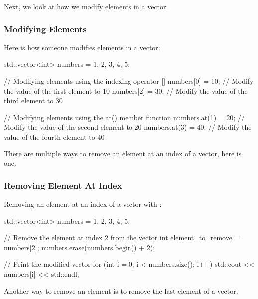 Next, we look at how we modify elements in a vector.

\begin{highlight}

\subsubsection*{Modifying Elements}

Here is how someone modifies elements in a vector:

\begin{code}
std::vector<int> numbers = {1, 2, 3, 4, 5};

// Modifying elements using the indexing operator []
numbers[0] = 10;  // Modify the value of the first element to 10
numbers[2] = 30;  // Modify the value of the third element to 30

// Modifying elements using the at() member function
numbers.at(1) = 20;  // Modify the value of the second element to 20
numbers.at(3) = 40;  // Modify the value of the fourth element to 40  
\end{code}

\end{highlight}

There are multiple ways to remove an element at an index of a vector, here is one.

\begin{highlight}

\subsubsection*{Removing Element At Index}

Removing an element at an index of a vector with :

\begin{code}
std::vector<int> numbers = {1, 2, 3, 4, 5};

// Remove the element at index 2 from the vector
int element_to_remove = numbers[2];
numbers.erase(numbers.begin() + 2);

// Print the modified vector
for (int i = 0; i < numbers.size(); i++) {
    std::cout << numbers[i] << std::endl;
}
\end{code}

\end{highlight}

Another way to remove an element is to remove the last element of a vector.

